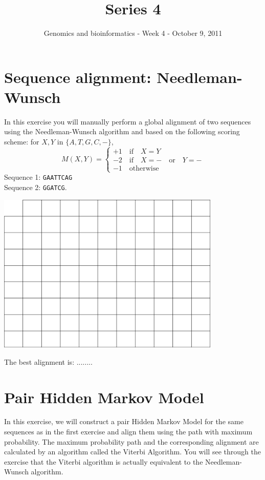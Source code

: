 \documentclass[a4paper,11pt]{article}
\title{Series 4}
\date{}
\author{Genomics and bioinformatics - Week 4 - October 9, 2011}
\begin{document}
\maketitle


\section{Sequence alignment: Needleman-Wunsch}
In this exercise you will manually perform a global alignment of two sequences using the
Needleman-Wunsch algorithm and based on the following scoring scheme: for $X,Y$ in $\{A,T,G,C,-\}$, 
$$
M(X,Y) = \left\{ 
\begin{array}{l}
	+1 \quad\text{if}\quad X = Y \\
	-2 \quad\text{if}\quad X = - \quad\text{or}\quad Y = - \\
	-1 \quad \text{otherwise}
\end{array} \right.
$$
Sequence 1: \texttt{GAATTCAG}\\
Sequence 2: \texttt{GGATCG}.
\vspace{0.5cm}
\begin{center}
\includegraphics[width=0.8\textwidth]{matrix.png}
\end{center}
\vspace{0.5cm}

The best alignment is: ........\\

\newpage 

\section{Pair Hidden Markov Model}

In this exercise, we will construct a pair Hidden Markov Model for
the same sequences as in the first exercise and align them using the
path with maximum probability. The maximum probability path and the 
corresponding alignment are calculated by an algorithm called the Viterbi Algorithm. 
You will see through the exercise that the Viterbi algorithm is actually equivalent
to the Needleman-Wunsch algorithm.
\end{document}
